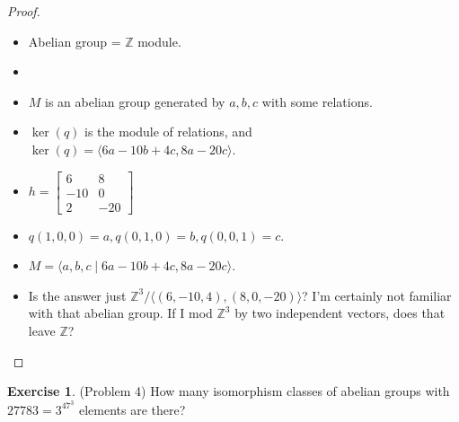 \documentclass[12pt, psamsfonts]{amsart}
\theoremstyle{definition}
\newtheorem*{exer}{Exercise}
\theoremstyle{remark}
\numberwithin{equation}{section}
\begin{document}
\begin{proof}
  \begin{itemize}
    \item
      Abelian group = $\mathbb{Z}$ module.
    \item
      \begin{center}
      \end{center}
    \item
      $M$ is an abelian group generated by $a, b, c$ with some relations.
    \item
      $\ker(q)$ is the module of relations, and $\ker(q) = \langle 6a - 10b + 4c, 8a - 20c \rangle$.
    \item
      $h = \begin{bmatrix} 6 & 8 \\ -10 & 0 \\ 2 & -20 \end{bmatrix}$
    \item
      $q(1, 0, 0) = a, q(0, 1, 0) = b, q(0, 0, 1) = c$.
    \item
      $M = \langle a, b, c \mid 6a - 10b + 4c, 8a - 20c \rangle$.
    \item
      Is the answer just $\mathbb{Z}^3 / \langle (6, -10, 4), (8, 0, -20) \rangle$?
      I'm certainly not familiar with that abelian group.
      If I mod $\mathbb{Z}^3$ by two independent vectors, does that leave $\mathbb{Z}$?
  \end{itemize}
\end{proof}

\begin{exer}{(Problem 4)}
  How many isomorphism classes of abelian groups with $27783 = 3^47^3$ elements are there?
\end{exer}
\end{document}
